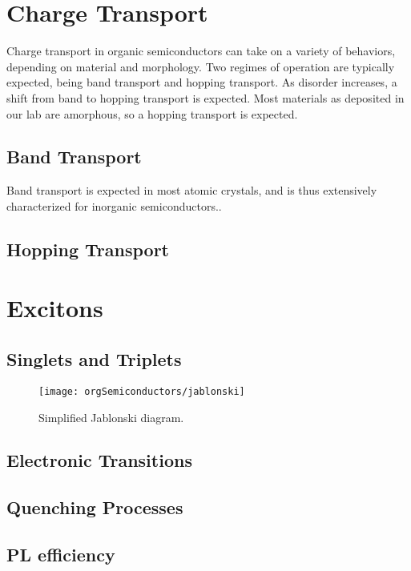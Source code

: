 \documentclass[../thesis.tex]{subfiles}
\begin{document}
\section{Charge Transport}

Charge transport in organic semiconductors can take on a variety of behaviors, depending on material and morphology.\cite{Pope1999,Mark1962}
Two regimes of operation are typically expected, being band transport and hopping transport.  
As disorder increases, a shift from band to hopping transport is expected.
Most materials as deposited in our lab are amorphous, so a hopping transport is expected.

\subsection{Band Transport}

Band transport is expected in most atomic crystals, and is thus extensively characterized for inorganic semiconductors.\supercite{Kasap1997}.

\subsection{Hopping Transport}

\section{Excitons}\label{sec:excitons}
\subsection{Singlets and Triplets}


\begin{wrapfigure}{r}{.5\textwidth}
\centering
\texttt{[image: orgSemiconductors/jablonski]}
\caption{Simplified Jablonski diagram.}
\label{fig:orgSemi_jablonski}
\end{wrapfigure}


\subsection{Electronic Transitions}
\subsection{Quenching Processes}
\subsection{PL efficiency}





\end{document}
